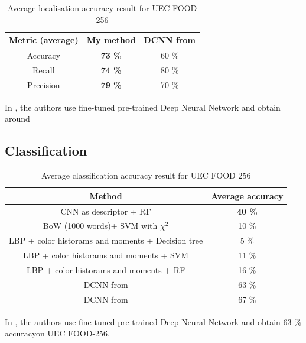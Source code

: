 \begin{table}
    \centering
    \renewcommand{\arraystretch}{1.2}
    \begin{tabular}{|c | c c|} 
        \hline
        Metric (average) & My method & DCNN from \cite{Bolanos2016} \\
        \hline
        Accuracy & \textbf{73 \%} & 60 \% \\ 
        \hline
        Recall &  \textbf{74 \%} & 80 \% \\
        \hline
        Precision &  \textbf{79 \%} & 70 \% \\
        \hline
    \end{tabular}
    \caption{Average localisation accuracy result for UEC FOOD 256}
\end{table}

In \cite{Bolanos2016}, the authors use fine-tuned pre-trained Deep Neural Network and obtain around

\subsection{Classification}

\begin{table}
    \centering
    \renewcommand{\arraystretch}{1.2}
    \begin{tabulary}{\textwidth}{| c | C|}
        \hline
        Method & Average accuracy \\
        \hline
        CNN as descriptor + RF & \textbf{40 \%} \\ 
        \hline
        BoW (1000 words)+ SVM with $\chi^2$ & 10 \% \\ %
        \hline
        LBP + color historams and moments + Decision tree & 5 \% \\ 
        \hline
        LBP + color historams and moments + SVM & 11 \% \\ %
        \hline
        LBP + color historams and moments + RF & 16 \% \\ %
        \hline
        DCNN from \cite{Bolanos2016} & 63 \%\\
        \hline 
        DCNN from \cite{Yanai2015} & 67 \%\\
        \hline 
    \end{tabulary}
    \caption{Average classification accuracy result for UEC FOOD 256}
\end{table}

In \cite{Bolanos2016}, the authors use fine-tuned pre-trained Deep Neural Network and obtain 63 \% accuracyon UEC FOOD-256.


